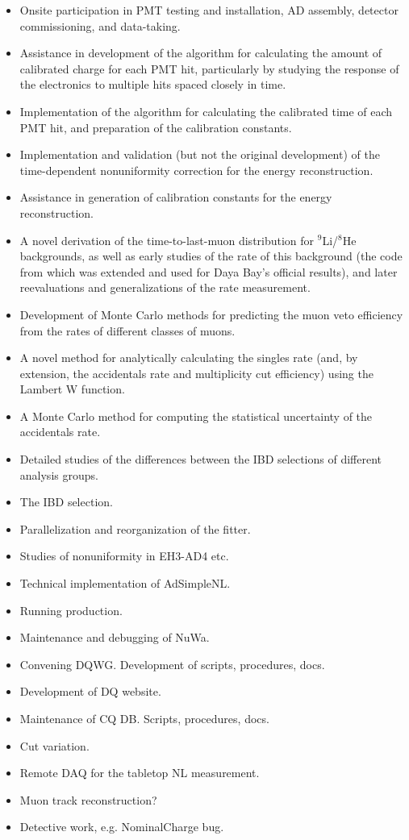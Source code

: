 \begin{itemize}
\item Onsite participation in PMT testing and installation, AD assembly, detector commissioning, and data-taking.
\item Assistance in development of the algorithm for calculating the amount of calibrated charge for each PMT hit, particularly by studying the response of the electronics to multiple hits spaced closely in time.
\item Implementation of the algorithm for calculating the calibrated time of each PMT hit, and preparation of the calibration constants.
\item Implementation and validation (but not the original development) of the time-dependent nonuniformity correction for the energy reconstruction.
\item Assistance in generation of calibration constants for the energy reconstruction.
\item A novel derivation of the time-to-last-muon distribution for $^9$Li/$^8$He backgrounds, as well as early studies of the rate of this background (the code from which was extended and used for Daya Bay's official results), and later reevaluations and generalizations of the rate measurement.
\item Development of Monte Carlo methods for predicting the muon veto efficiency from the rates of different classes of muons.
\item A novel method for analytically calculating the singles rate (and, by extension, the accidentals rate and multiplicity cut efficiency) using the Lambert W function.
\item A Monte Carlo method for computing the statistical uncertainty of the accidentals rate.
\item Detailed studies of the differences between the IBD selections of different analysis groups.
\item The IBD selection.
\item Parallelization and reorganization of the fitter.
\item Studies of nonuniformity in EH3-AD4 etc.
\item Technical implementation of AdSimpleNL.
\item Running production.
\item Maintenance and debugging of NuWa.
\item Convening DQWG. Development of scripts, procedures, docs.
\item Development of DQ website.
\item Maintenance of CQ DB. Scripts, procedures, docs.
\item Cut variation.
\item Remote DAQ for the tabletop NL measurement.
\item Muon track reconstruction?
\item Detective work, e.g. NominalCharge bug.
\end{itemize}
